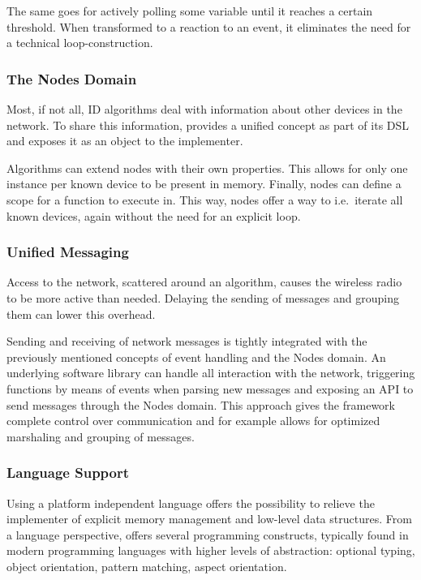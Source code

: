 \documentclass[3p,times,procedia]{elsarticle}
\begin{document}
The same goes for actively polling some variable until it reaches a certain
threshold. When transformed to a reaction to an event, it eliminates the need
for a technical loop-construction.

\subsubsection{The Nodes Domain}

Most, if not all, ID algorithms deal with information about other devices in
the network. To share this information, \NAME provides a unified 
concept as part of its DSL and exposes it as an object to the implementer.

Algorithms can extend nodes with their own properties. This allows for only one
instance per known device to be present in memory. Finally, nodes can define a
scope for a function to execute in. This way, nodes offer a way to i.e.\
iterate all known devices, again without the need for an explicit loop.

\subsubsection{Unified Messaging}
\label{dsl-unified-msg}

Access to the network, scattered around an algorithm, causes the wireless radio
to be more active than needed. Delaying the sending of messages and grouping
them can lower this overhead.

Sending and receiving of network messages is tightly integrated with the
previously mentioned concepts of event handling and the Nodes domain. An
underlying software library can handle all interaction with the network,
triggering functions by means of events when parsing new messages and exposing
an API to send messages through the Nodes domain. This approach gives the
framework complete control over communication and for example allows for
optimized marshaling and grouping of messages.

\subsubsection{Language Support}
\label{language-support}

Using a platform independent language offers the possibility to relieve the
implementer of explicit memory management and low-level data structures. From a
language perspective, \NAME offers several programming constructs, typically
found in modern programming languages with higher levels of abstraction:
optional typing, object orientation, pattern matching, aspect orientation.
\end{document}
